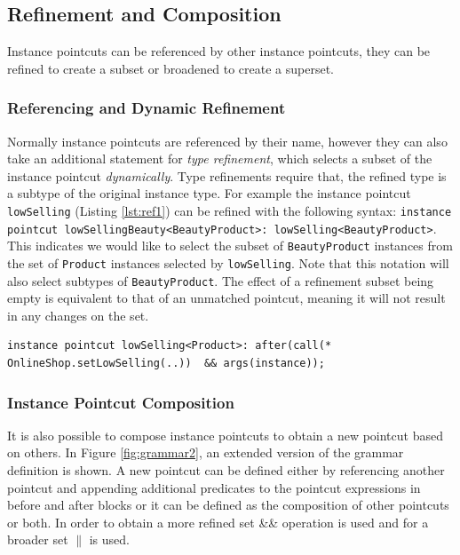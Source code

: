 \documentclass{llncs}
\begin{document}
\subsection{Refinement and Composition}

Instance pointcuts can be referenced by other instance pointcuts, they can be refined to create a subset or broadened to create a superset. 

\subsubsection{Referencing and Dynamic Refinement}
Normally instance pointcuts are referenced by their name, however they can also take an additional statement for \emph{type refinement}, which selects a subset of the instance pointcut \emph{dynamically}. Type refinements require that, the refined type is a subtype of the original instance type. For example the instance pointcut \texttt{lowSelling} (Listing \ref{lst:ref1}) can be refined with the following syntax: \lstinline!instance pointcut lowSellingBeauty<BeautyProduct>: lowSelling<BeautyProduct>!. 
This indicates we would like to select the subset of \texttt{BeautyProduct} instances from the set of \texttt{Product} instances selected by \texttt{lowSelling}. 
Note that this notation will also select subtypes of \texttt{BeautyProduct}. 
The effect of a refinement subset being empty is equivalent to that of an unmatched pointcut, meaning it will not result in any changes on the set.


\begin{lstlisting}[float=h!, caption={Two instance pointcuts composed to obtain a new one}, label={lst:ref1}]
instance pointcut lowSelling<Product>: after(call(* OnlineShop.setLowSelling(..))  && args(instance));
\end{lstlisting}

\subsubsection{Instance Pointcut Composition}
It is also possible to compose instance pointcuts to obtain a new pointcut based on others. In Figure \ref{fig:grammar2}, an extended version of the grammar definition is shown. A new pointcut can be defined either by referencing another pointcut and appending additional predicates to the pointcut expressions in before and after blocks or it can be defined as the composition of other pointcuts or both. In order to obtain a more refined set \&\& operation is used and for a broader set $\|$ is used. 
\end{document}
